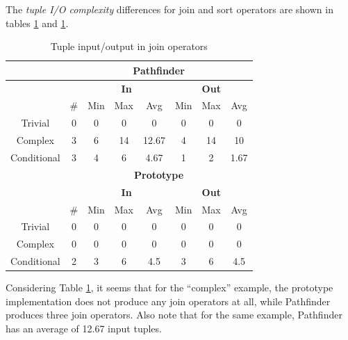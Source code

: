 \newpage
The \textit{tuple I/O complexity} differences for \textsf{join}
and \textsf{sort} operators are shown in tables
\ref{table:result:complexity_matrix_tio_1} and
\ref{table:result:complexity_matrix_tio_1}.

\begin{table}[!htp]
 \begin{center}
 \begin{tabular}{| c | c | c | c | c | c | c | c |}
  \hline
   & \multicolumn{7}{|c|}{\textbf{Pathfinder}} \\
   \hline
   &  & \multicolumn{3}{|c|}{\textbf{In}} &
   \multicolumn{3}{|c|}{\textbf{Out}}  \\
   \hline
   &  \# & Min & Max & Avg & Min & Max & Avg\\
   \hline
   Trivial & 0 & 0 & 0 & 0 & 0 & 0 & 0  \\
   \hline
   Complex & 3 & 6 & 14 & 12.67 & 4 & 14 & 10  \\
   \hline
   Conditional & 3 & 4 & 6 & 4.67 & 1 & 2 & 1.67  \\
   \hline
   & \multicolumn{7}{|c|}{\textbf{Prototype}} \\
   \hline
   &  & \multicolumn{3}{|c|}{\textbf{In}} & 
   \multicolumn{3}{|c|}{\textbf{Out}} \\
   \hline
   & \# & Min & Max & Avg & Min & Max & Avg \\ 
   \hline 
   Trivial & 0 & 0 & 0 & 0 & 0 & 0 & 0 \\
   \hline
   Complex & 0 & 0 & 0 & 0 & 0 & 0 & 0 \\
   \hline
   Conditional & 2 & 3 & 6 & 4.5 & 3 & 6 & 4.5 \\
   \hline
 \end{tabular}
\caption{Tuple input/output in join operators}
\label{table:result:complexity_matrix_tio_1}
 \end{center}
\end{table}

Considering Table \ref{table:result:complexity_matrix_tio_1}, it seems that for
the ``complex'' example, the prototype implementation does not produce any
join operators at all, while Pathfinder produces three join operators. Also
note that for the same example, Pathfinder has an average of 12.67 input tuples.

